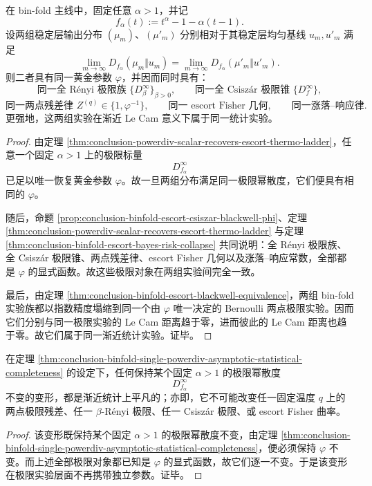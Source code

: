 \begin{theorem}[单一幂散度的渐近统计完备性]\label{thm:conclusion-binfold-single-powerdiv-asymptotic-statistical-completeness}
在 bin-fold 主线中，固定任意 \(\alpha>1\)，并记
\[
f_\alpha(t):=t^\alpha-1-\alpha(t-1).
\]
设两组稳定层输出分布 \((\mu_m)\)、\((\mu'_m)\) 分别相对于其稳定层均匀基线 \(u_m,u'_m\) 满足
\[
\lim_{m\to\infty}D_{f_\alpha}(\mu_m\Vert u_m)
=
\lim_{m\to\infty}D_{f_\alpha}(\mu'_m\Vert u'_m).
\]
则二者具有同一黄金参数 \(\varphi\)，并因而同时具有：
\[
\text{同一全 Rényi 极限族 }\{D_\beta^\infty\}_{\beta>0},
\qquad
\text{同一全 Csisz\'ar 极限锥 }\{D_f^\infty\},
\]
\[
\text{同一两点残差律 }Z^{(q)}\in\{1,\varphi^{-1}\},
\qquad
\text{同一 escort Fisher 几何},
\qquad
\text{同一涨落--响应律}.
\]
更强地，这两组实验在渐近 Le Cam 意义下属于同一统计实验。
\end{theorem}

\begin{proof}
由定理 \ref{thm:conclusion-powerdiv-scalar-recovers-escort-thermo-ladder}，任意一个固定 \(\alpha>1\) 上的极限标量
\[
D_{f_\alpha}^\infty
\]
已足以唯一恢复黄金参数 \(\varphi\)。故一旦两组分布满足同一极限幂散度，它们便具有相同的 \(\varphi\)。

随后，命题 \ref{prop:conclusion-binfold-escort-csiszar-blackwell-phi}、定理 \ref{thm:conclusion-powerdiv-scalar-recovers-escort-thermo-ladder} 与定理 \ref{thm:conclusion-binfold-escort-bayes-risk-collapse} 共同说明：全 Rényi 极限族、全 Csisz\'ar 极限锥、两点残差律、escort Fisher 几何以及涨落--响应常数，全部都是 \(\varphi\) 的显式函数。故这些极限对象在两组实验间完全一致。

最后，由定理 \ref{thm:conclusion-binfold-escort-blackwell-equivalence}，两组 bin-fold 实验族都以指数精度塌缩到同一个由 \(\varphi\) 唯一决定的 Bernoulli 两点极限实验。因而它们分别与同一极限实验的 Le Cam 距离趋于零，进而彼此的 Le Cam 距离也趋于零。故它们属于同一渐近统计实验。证毕。
\end{proof}

\begin{corollary}\label{cor:conclusion-binfold-no-nontrivial-nuisance-deformation-fixed-powerdiv}
在定理 \ref{thm:conclusion-binfold-single-powerdiv-asymptotic-statistical-completeness} 的设定下，任何保持某个固定 \(\alpha>1\) 的极限幂散度
\[
D_{f_\alpha}^\infty
\]
不变的变形，都是渐近统计上平凡的；亦即，它不可能改变任一固定温度 \(q\) 上的两点极限残差、任一 \(\beta\)-Rényi 极限、任一 Csisz\'ar 极限、或 escort Fisher 曲率。
\end{corollary}

\begin{proof}
该变形既保持某个固定 \(\alpha>1\) 的极限幂散度不变，由定理 \ref{thm:conclusion-binfold-single-powerdiv-asymptotic-statistical-completeness}，便必须保持 \(\varphi\) 不变。而上述全部极限对象都已知是 \(\varphi\) 的显式函数，故它们逐一不变。于是该变形在极限实验层面不再携带独立参数。证毕。
\end{proof}
